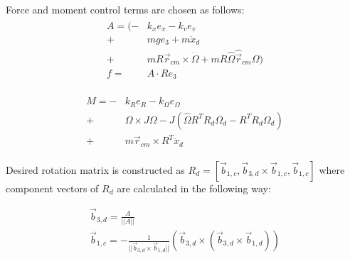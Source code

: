 Force and moment control terms are chosen as follows:
\begin{align}
	\begin{split}
		A = (-& k_x e_x - k_v e_v \\
		+& mge_3 + m\ddot{x}_d \\
		+& mR\vec{r}_{cm}  \times \dot{\Omega} + mR\hat{\Omega}\hat{\vec{r}}_{cm}\Omega ) \\
		f =& A \cdot Re_3 \label{force_control}
	\end{split}
\end{align}

\begin{align}
	\begin{split}
		M = -& k_R e_R - k_\Omega e_\Omega \\
			+& \Omega \times J\Omega - J(\hat{\Omega}R^TR_d\Omega_d - R^TR_d\dot{\Omega}_d) \\
			+& m\vec{r}_{cm} \times R^T \ddot{x}_d
	\end{split}
\end{align}

Desired rotation matrix is constructed as 
$R_d = [\vec{b}_{1,c}, \vec{b}_{3,d} \times \vec{b}_{1,c}, \vec{b}_{1,c}]$ where component vectors of $R_d$ are calculated in the following way:

\begin{gather}
	\vec{b}_{3,d} = \frac{A}{|| A ||} \\
	\vec{b}_{1,c} = -\frac{1}{||\vec{b}_{3,d} \times \vec{b}_{1,d}||}(\vec{b}_{3,d} \times (\vec{b}_{3,d} \times \vec{b}_{1,d}))
\end{gather}


